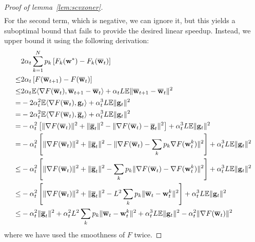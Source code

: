 \begin{proof}[Proof of lemma~\ref{lem:scvxoner}]
\begin{align*}
	\end{align*}
	For the second term, which is negative, we can ignore it, but this
	yields a suboptimal bound that fails to provide the desired linear
	speedup. Instead, we upper bound it using the following derivation:
	\begin{align*}
	& 2\alpha_{t}\sum_{k=1}^{N}p_{k}\left[F_{k}({\mathbf{w}}^{\ast})-F_{k}({\overline{\mathbf{w}}}_{t})\right]\\
	\leq& 2\alpha_{t}\left[F({\overline{\mathbf{w}}}_{t+1})-F({\overline{\mathbf{w}}}_{t})\right]\\
	\leq& 2\alpha_{t}\mathbb{E}\langle\nabla F({\overline{\mathbf{w}}}_{t}),{\overline{\mathbf{w}}}_{t+1}-{\overline{\mathbf{w}}}_{t}\rangle+\alpha_{t}L\mathbb{E}\|{\overline{\mathbf{w}}}_{t+1}-{\overline{\mathbf{w}}}_{t}\|^{2}\\
	 =& -2\alpha_{t}^{2}\mathbb{E}\langle\nabla F({\overline{\mathbf{w}}}_{t}),{\mathbf{g}}_{t}\rangle+\alpha_{t}^{3}L\mathbb{E}\|{\mathbf{g}}_{t}\|^{2}\\
	=&-2\alpha_{t}^{2}\mathbb{E}\langle\nabla F({\overline{\mathbf{w}}}_{t}),{\overline{\mathbf{g}}}_{t}\rangle+\alpha_{t}^{3}L\mathbb{E}\|{\mathbf{g}}_{t}\|^{2}\\
	=&-\alpha_{t}^{2}\left[\|\nabla F({\overline{\mathbf{w}}}_{t})\|^{2}+\|{\overline{\mathbf{g}}}_{t}\|^{2}-\|\nabla F({\overline{\mathbf{w}}}_{t})-{\overline{\mathbf{g}}}_{t}\|^{2}\right]+\alpha_{t}^{3}L\mathbb{E}\|{\mathbf{g}}_{t}\|^{2}\\
	=&-\alpha_{t}^{2}\left[\|\nabla F({\overline{\mathbf{w}}}_{t})\|^{2}+\|{\overline{\mathbf{g}}}_{t}\|^{2}-\|\nabla F({\overline{\mathbf{w}}}_{t})-\sum_{k}p_{k}\nabla F({\mathbf{w}}_{t}^{k})\|^{2}\right]+\alpha_{t}^{3}L\mathbb{E}\|{\mathbf{g}}_{t}\|^{2}\\
   \leq&-\alpha_{t}^{2}\left[\|\nabla F({\overline{\mathbf{w}}}_{t})\|^{2}+\|{\overline{\mathbf{g}}}_{t}\|^{2}-\sum_{k}p_{k}\|\nabla F({\overline{\mathbf{w}}}_{t})-\nabla F({\mathbf{w}}_{t}^{k})\|^{2}\right]+\alpha_{t}^{3}L\mathbb{E}\|{\mathbf{g}}_{t}\|^{2}\\
	\leq&-\alpha_{t}^{2}\left[\|\nabla F({\overline{\mathbf{w}}}_{t})\|^{2}+\|{\overline{\mathbf{g}}}_{t}\|^{2}-L^{2}\sum_{k}p_{k}\|{\overline{\mathbf{w}}}_{t}-{\mathbf{w}}_{t}^{k}\|^{2}\right]+\alpha_{t}^{3}L\mathbb{E}\|{\mathbf{g}}_{t}\|^{2}\\
	\leq&-\alpha_{t}^{2}\|{\overline{\mathbf{g}}}_{t}\|^{2}+\alpha_{t}^{2}L^{2}\sum_{k}p_{k}\|{\overline{\mathbf{w}}}_{t}-{\mathbf{w}}_{t}^{k}\|^{2}+\alpha_{t}^{3}L\mathbb{E}\|{\mathbf{g}}_{t}\|^{2}-\alpha_{t}^{2}\|\nabla F({\overline{\mathbf{w}}}_{t})\|^{2}
	\end{align*}
	where we have used the smoothness of $F$ twice. 
	

\end{proof}
